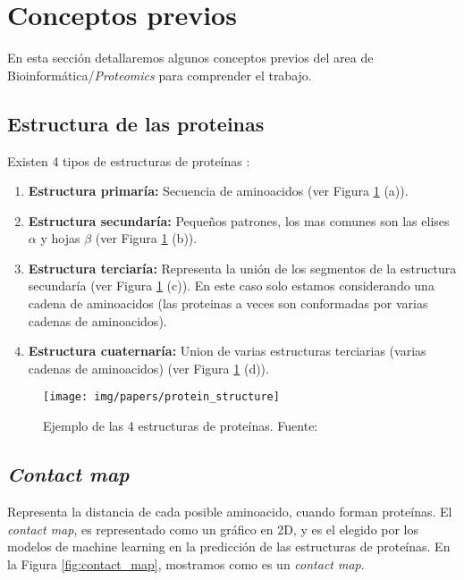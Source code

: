 \documentclass{article}
\begin{document}
	
	\section{Conceptos previos}
	
	En esta sección detallaremos algunos conceptos previos del area de Bioinformática/\textit{Proteomics} para comprender el trabajo.
	
	\subsection{Estructura de las proteinas}
	
	Existen 4 tipos de estructuras de proteínas \citep{russell2002igenetics}:
	
	\begin{enumerate}
		\item \textbf{Estructura primaría:} Secuencia de aminoacidos (ver Figura \ref{fig:protein_structure} (a)).
		\item \textbf{Estructura secundaría:} Pequeños patrones, los mas comunes son las elises $\alpha$ y hojas $\beta$ (ver Figura \ref{fig:protein_structure} (b)).
		\item \textbf{Estructura terciaría:} Representa la unión de los segmentos de la estructura secundaría (ver Figura \ref{fig:protein_structure} (c)). En este caso solo estamos considerando una cadena de aminoacidos (las proteinas a veces son conformadas por varias cadenas de aminoacidos).
		\item \textbf{Estructura cuaternaría:} Union de varias estructuras terciarias (varias cadenas de aminoacidos) (ver Figura \ref{fig:protein_structure} (d)).
	\end{enumerate}
	
	
	\begin{figure}
		\centering
		\texttt{[image: img/papers/protein\_structure]}
		\caption{Ejemplo de las 4 estructuras de proteínas. Fuente: \citep{russell2002igenetics}}
		\label{fig:protein_structure}
	\end{figure}
	
	
	\subsection{\textit{Contact map}}
	
	Representa la distancia de cada posible aminoacido, cuando forman proteínas. El \textit{contact map}, es representado como un gráfico en 2D, y es el elegido por los modelos de machine learning en la predicción de las estructuras de proteínas. En la Figura \ref{fig:contact_map}, mostramos como es un \textit{contact map}.
	
\end{document}
